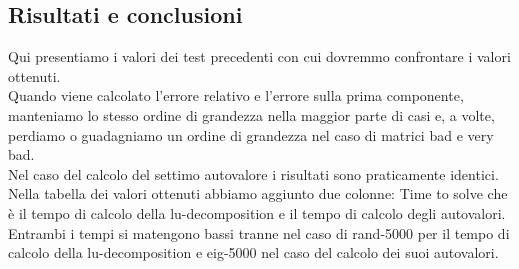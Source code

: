 \documentclass[12pt]{article}
\begin{document}
\subsection{Risultati e conclusioni}
Qui presentiamo i valori dei test precedenti con cui dovremmo confrontare i valori ottenuti.\\
Quando viene calcolato l'errore relativo e l'errore sulla prima componente, manteniamo lo stesso ordine di grandezza nella maggior parte di casi e, a volte, perdiamo o guadagniamo un ordine di grandezza nel caso di matrici bad e very bad. \\
Nel caso del calcolo del settimo autovalore i risultati sono praticamente identici. \\
Nella tabella dei valori ottenuti abbiamo aggiunto due colonne: Time to solve che \`e il tempo di calcolo della lu-decomposition e il tempo di calcolo degli autovalori. \\
Entrambi i tempi si matengono bassi tranne nel caso di rand-5000 per il tempo di calcolo della lu-decomposition e eig-5000 nel caso del calcolo dei suoi autovalori. \\
\end{document}
